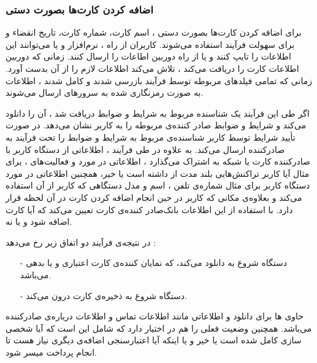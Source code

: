 \documentclass[oneside]{report}
\begin{document}
\subsubsection{اضافه کردن کارت‌ها بصورت دستی}
برای اضافه کردن کارت‌ها بصورت دستی ، اسم کارت، شماره کارت، تاریخ انقضاء و 
{\normalsize {}} 
برای سهولت فرآیند استفاده می‌شوند. کاربران از راه 
{\normalsize {}} 
، نرم‌افزار
{\normalsize {}}
و یا 
{\normalsize {}} 
می‌توانند این اطلاعات را تایپ کنند و یا از راه دوربین
{\normalsize {}} 
اطاعات را ارسال کنند.
زمانی که دوربین اطلاعات کارت را دریافت می‌کند ، 
{\normalsize {}}
تلاش می‌کند اطلاعات لازم را از آن بدست آورد. زمانی که تمامی فیلد‌های مربوطه  توسط فرآیند 
{\normalsize {}}
بازرسی شدند و 
کامل شدند ، اطلاعات به صورت رمزنگاری شده به سرور‌های 
{\normalsize {}} ارسال می‌شوند.

اگر طی این فرآیند یک شناسنده مربوط به شرایط و 	ضوابط دریافت شد ، 
{\normalsize {}}
آن را دانلود می‌کند و شرایط و ضوابط صادر کننده‌ی مربوطه را به کاربر نشان می‌دهد. در صورت تأیید شرایط توسط کاربر 
{\normalsize {}}
شناسنده‌ی مربوط به شرایط و ضوابط را تحت فرآیند 
{\normalsize {}}  
به صادرکننده ارسال می‌کند. به علاوه در طی فرآیند 
{\normalsize {}}   ، 
{\normalsize {}} 
اطلاعاتی از دستگاه کاربر با صادرکننده کارت یا شبکه به اشتراک می‌گذارد ، اطلاعاتی در مورد 
{\normalsize {}}
و فعالیت‌های 
{\normalsize {}}
، برای مثال آیا کاربر تراکنش‌هایی بلند مدت از 
{\normalsize {}}
داشته است یا خیر، همچنین اطلاعاتی در مورد دستگاه کاربر برای مثال شماره‌ی تلفن ، اسم و مدل دستگاهی که کاربر از آن استفاده می‌کند و بعلاوه‌ی مکانی که کاربر در حین انجام اضافه کردن کارت در آن لحظه قرار دارد. 
با استفاده از این اطلاعات بانک‌صادر کننده‌ی کارت تعیین می‌کند که آیا کارت اضافه شود و یا نه. 

در  نتیجه‌ی فرآیند 
{\normalsize {}} 
دو اتفاق زیر رخ می‌دهد : 
\begin{itemize}
	\item[-] دستگاه شروع به دانلود  {\normalsize {}}   می‌کند، که نمایان کننده‌ی کارت اعتباری و یا بدهی می‌باشد.
	\item[-] دستگاه شروع به ذخیره‌ی کارت درون {\normalsize {}} می‌کند. 
\end{itemize}


{\normalsize {}} 
حاوی 
{\normalsize {}} ها
	برای دانلود 
	{\normalsize {}}
	و اطلاعاتی مانند اطلاعات تماس و اطلاعات درباره‌ی صادرکننده می‌باشد. همچنین وضعیت فعلی را هم در اختیار دارد که شامل این است که آیا شخصی سازی 
	{\normalsize {}}
	کامل شده است یا خیر و یا اینکه آیا اعتبارسنجی اضافه‌ی دیگری نیاز هست تا انجام پرداخت میسر شود.
	
\end{document}
